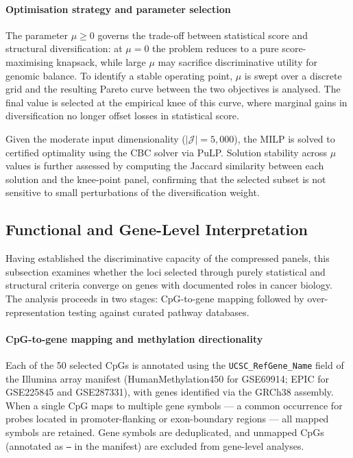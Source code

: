 \paragraph{Optimisation strategy and parameter selection}

The parameter $\mu \ge 0$ governs the trade-off between
statistical score and structural diversification: at $\mu = 0$
the problem reduces to a pure score-maximising knapsack, while
large $\mu$ may sacrifice discriminative utility for genomic
balance. To identify a stable operating point, $\mu$ is swept
over a discrete grid and the resulting Pareto curve between
the two objectives is analysed. The final value is selected
at the empirical knee of this curve, where marginal gains in
diversification no longer offset losses in statistical score.

Given the moderate input dimensionality ($|\mathcal{J}| = 5{,}000$),
the MILP is solved to certified optimality using the CBC
solver via PuLP. Solution stability across $\mu$ values is
further assessed by computing the Jaccard similarity between
each solution and the knee-point panel, confirming that the
selected subset is not sensitive to small perturbations of the
diversification weight.


\subsection{Functional and Gene-Level Interpretation}
\label{sec:gene_enrichment}

Having established the discriminative capacity of the compressed
panels, this subsection examines whether the loci selected
through purely statistical and structural criteria converge
on genes with documented roles in cancer biology. The analysis
proceeds in two stages: CpG-to-gene mapping followed by
over-representation testing against curated pathway databases.

\paragraph{CpG-to-gene mapping and methylation directionality}

Each of the 50 selected CpGs is annotated using the
\texttt{UCSC\_RefGene\_Name} field of the Illumina array
manifest (HumanMethylation450 for GSE69914; EPIC for
GSE225845 and GSE287331), with genes identified via the
GRCh38 assembly. When a single CpG maps to multiple gene
symbols — a common occurrence for probes located in
promoter-flanking or exon-boundary regions — all mapped
symbols are retained. Gene symbols are deduplicated, and
unmapped CpGs (annotated as \texttt{--} in the manifest)
are excluded from gene-level analyses.

